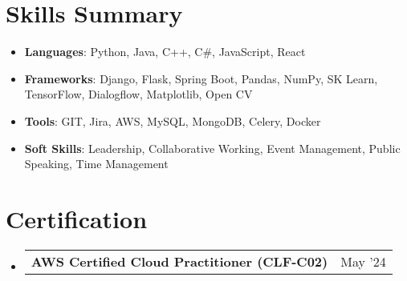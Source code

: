 \documentclass[a4paper,20pt]{article}
\makeatletter
\newcommand{\resumeItem}[2]{
	\item\small{
		\textbf{#1}{#2 \vspace{-2pt}}
	}
}
\newcommand{\resumeCertification}[2]{
	\vspace{-1pt}\item
	\begin{tabular*}{0.97\textwidth}{l@{\extracolsep{\fill}}r}
		\textbf{#1} & #2 \\
	\end{tabular*}\vspace{-5pt}
}
\newcommand{\resumeSubItem}[2]{\resumeItem{#1}{#2}\vspace{-3pt}}
\newcommand{\resumeSubHeadingListStart}{\begin{itemize}[leftmargin=*]}
\newcommand{\resumeSubHeadingListEnd}{\end{itemize}}
\makeatother
\begin{document}
	
	\section{Skills Summary}
    	\resumeSubHeadingListStart
        	\resumeSubItem{Languages}{\hspace{0.5cm}: Python, Java, C++, C\#, JavaScript, React}
        	\resumeSubItem{Frameworks}{\hspace{0.2cm}: Django, Flask, Spring Boot, Pandas, NumPy, SK Learn, TensorFlow, Dialogflow, Matplotlib, Open CV}
        	\resumeSubItem{Tools}{\hspace{1.3cm}: GIT, Jira, AWS, MySQL, MongoDB, Celery, Docker}
        	\resumeSubItem{Soft Skills}{\hspace{0.50cm}: Leadership, Collaborative Working, Event Management, Public Speaking, Time Management}
        	
    	\resumeSubHeadingListEnd
	\vspace{2pt}
		
	\section{Certification}
       
        \resumeSubHeadingListStart
        \resumeCertification{AWS Certified Cloud Practitioner (CLF-C02)}{May '24}
        \resumeSubHeadingListEnd

    \vspace{2pt}
        
\end{document}
